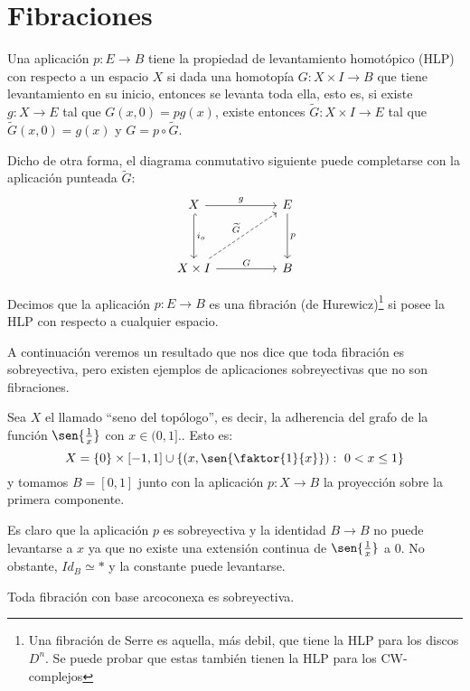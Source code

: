 \section{Fibraciones}
\begin{defin}
Una aplicación $p : E \longrightarrow B$ tiene la propiedad de levantamiento homotópico (HLP) con respecto a un espacio $X$ si dada una homotopía $G : X \times I \longrightarrow B$ que tiene levantamiento en su inicio, entonces se levanta toda ella, esto es, si existe $g : X \longrightarrow E$ tal que  $G(x, 0) = pg(x)$, existe entonces $\widetilde{G} : X \times I \longrightarrow E$ tal que $\widetilde{G}(x,0) = g(x)$ y $G = p \circ \widetilde{G}$. \par
Dicho de otra forma, el diagrama conmutativo siguiente puede completarse con la aplicación punteada $\widetilde{G}$:
\[
\begin{tikzcd}
X \arrow{rr}{g} \arrow[hook]{dd}{i_o} &  & E \arrow{dd}{p} \\
\\
X \times I \arrow{rr}{G} \arrow[dashed]{uurr}{\widetilde{G}} & & B
\end{tikzcd}
\]
\end{defin}
\begin{defin}
Decimos que la aplicación $p : E \longrightarrow B$ es una fibración (de Hurewicz)\footnote{Una fibración de Serre es aquella, más debil, que tiene la HLP para los discos $D^n$. Se puede probar que estas también tienen la HLP para los CW-complejos} si posee la HLP con respecto a cualquier espacio.
\end{defin}
A continuación veremos un resultado que nos dice que toda fibración es sobreyectiva, pero existen ejemplos de aplicaciones sobreyectivas que no son fibraciones.
\begin{ejem}
Sea $X$ el llamado ``seno del topólogo'', es decir, la adherencia del grafo de la función $\sen{\frac{1}{x}}$ con $x \in (0,1]$.. Esto es:
\[ X = \{0\} \times [-1,1] \cup \{ (x, \sen{\faktor{1}{x}}) : \ 0 < x \leq 1 \} \]
y tomamos $B = [0,1]$ junto con la aplicación $p : X \longrightarrow B$ la proyección sobre la primera componente. \par
Es claro que la aplicación $p$ es sobreyectiva y la identidad $B \longrightarrow B$ no puede levantarse a $x$ ya que no existe una extensión continua de $\sen{\frac{1}{x}}$ a $0$. No obstante, $Id_B \simeq *$ y la constante puede levantarse.
\end{ejem}
\begin{prop}
Toda fibración con base arcoconexa es sobreyectiva.
\end{prop}
